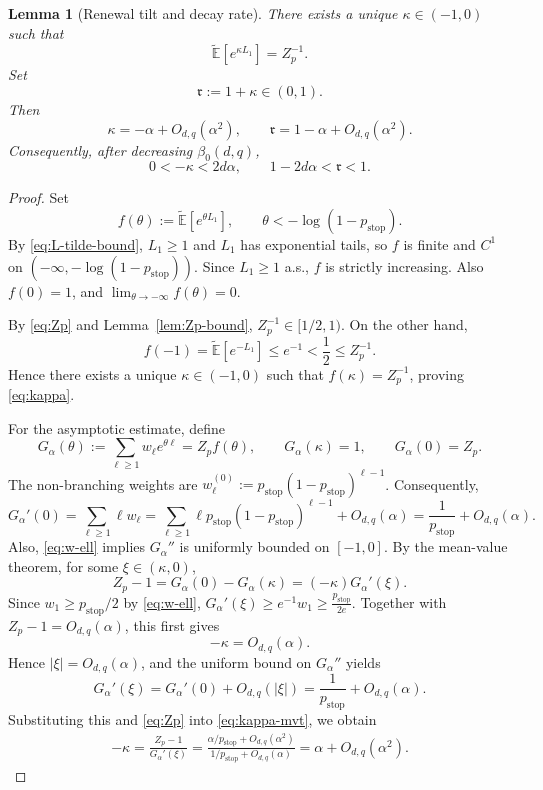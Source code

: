 \documentclass[letterpaper,11pt,reqno]{amsart}
\newtheorem{lem}[thm]{Lemma}
\theoremstyle{definition}
\begin{document}
\begin{lem}[Renewal tilt and decay rate]\label{lem:kappa bound}
There exists a unique \(\kappa\in(-1,0)\) such that
\begin{equation}\label{eq:kappa}
    \tilde{\mathbb E}[e^{\kappa L_1}]=Z_p^{-1}.
\end{equation}
Set
\[
\mathfrak r:=1+\kappa\in(0,1).
\]
Then
\[
\kappa=-\alpha+O_{d,q}(\alpha^2),
\qquad
\mathfrak r=1-\alpha+O_{d,q}(\alpha^2).
\]
Consequently, after decreasing \(\beta_0(d,q)\),
\[
0<-\kappa<2d\alpha,
\qquad
1-2d\alpha<\mathfrak r<1.
\]
\end{lem}



\begin{proof}
Set
\[
f(\theta):=\tilde{\mathbb E}[e^{\theta L_1}],
\qquad
\theta<-\log(1-p_{\mathrm{stop}}).
\]
By \eqref{eq:L-tilde-bound}, \(L_1\ge1\) and \(L_1\) has exponential tails, so \(f\) is finite and \(C^1\) on
\((-\infty,-\log(1-p_{\mathrm{stop}}))\). Since \(L_1\ge1\) a.s., \(f\) is strictly increasing. Also
\(f(0)=1\), and \(\lim_{\theta\to-\infty}f(\theta)=0\).

By \eqref{eq:Zp} and Lemma~\ref{lem:Zp-bound}, $Z_p^{-1}\in[1/2,1)$. On the other hand,
\[
f(-1)=\tilde{\mathbb E}[e^{-L_1}]\le e^{-1}<\frac12\le Z_p^{-1}.
\]
Hence there exists a unique \(\kappa\in(-1,0)\) such that \(f(\kappa)=Z_p^{-1}\), proving \eqref{eq:kappa}.



For the asymptotic estimate, define
\[
G_\alpha(\theta):=\sum_{\ell\ge1}w_\ell e^{\theta\ell}=Z_p f(\theta),\qquad
G_\alpha(\kappa)=1,\qquad
G_\alpha(0)=Z_p.
\]
The non-branching weights are
$w_\ell^{(0)}
:=
p_{\mathrm{stop}}(1-p_{\mathrm{stop}})^{\ell-1}$.
Consequently,
\[
G_\alpha'(0)
=
\sum_{\ell\ge1}\ell w_\ell
=
\sum_{\ell\ge1}
\ell p_{\mathrm{stop}}
(1-p_{\mathrm{stop}})^{\ell-1}
+O_{d,q}(\alpha)
=
\frac1{p_{\mathrm{stop}}}+O_{d,q}(\alpha).
\]
Also, \eqref{eq:w-ell} implies \(G_\alpha''\) is uniformly bounded on \([-1,0]\). 
By the mean-value theorem, for some \(\xi\in(\kappa,0)\),
\begin{equation}\label{eq:kappa-mvt}
    Z_p-1
    =
    G_\alpha(0)-G_\alpha(\kappa)
    =
    (-\kappa)G_\alpha'(\xi).
\end{equation}
Since \(w_1\ge p_{\mathrm{stop}}/2\) by \eqref{eq:w-ell}, $G_\alpha'(\xi)
    \ge
    e^{-1}w_1
    \ge
    \frac{p_{\mathrm{stop}}}{2e}$.
Together with \(Z_p-1=O_{d,q}(\alpha)\), this first gives
\[
    -\kappa=O_{d,q}(\alpha).
\]
Hence \(|\xi|=O_{d,q}(\alpha)\), and the uniform bound on
\(G_\alpha''\) yields
\[
    G_\alpha'(\xi)
    =
    G_\alpha'(0)+O_{d,q}(|\xi|)
    =
    \frac1{p_{\mathrm{stop}}}
    +O_{d,q}(\alpha).
\]
Substituting this and \eqref{eq:Zp} into
\eqref{eq:kappa-mvt}, we obtain
\[
\begin{aligned}
-\kappa
=
\frac{Z_p-1}{G_\alpha'(\xi)}
=
\frac{\alpha/p_{\mathrm{stop}}+O_{d,q}(\alpha^2)}
     {1/p_{\mathrm{stop}}+O_{d,q}(\alpha)}=
\alpha+O_{d,q}(\alpha^2).
\end{aligned}
\]
\end{proof}
\end{document}
